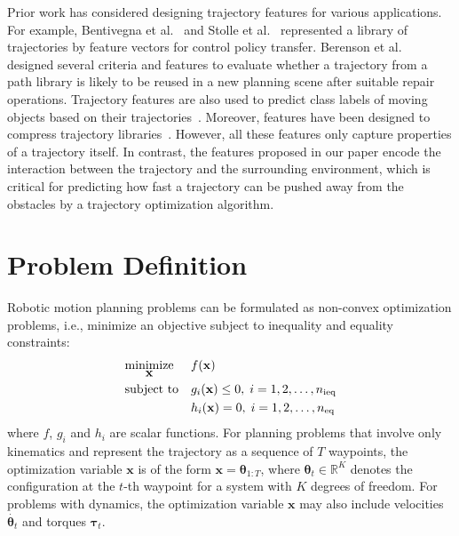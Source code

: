 \documentclass[letterpaper, 10 pt, conference]{ieeeconf}  %
\newcommand{\x}{\mbox{$\mathbf x$}}
\newcommand{\btheta}{\mbox{$\bm \theta$}}
\begin{document}
Prior work has considered designing trajectory features for various applications. For example, Bentivegna et al.~\cite{Bentivegna:2006:LST} and Stolle et al.~\cite{Stolle:2007:TPT} represented a library of trajectories by feature vectors for control policy transfer. 
Berenson et al.~\cite{Berenson:2012:RPP} designed several criteria and features to evaluate whether a trajectory from a path library is likely to be reused in a new planning scene after suitable repair operations. Trajectory features are also used to predict class labels of moving objects based on their trajectories~\cite{Lee:2008:TTC}. Moreover, features have been designed to compress trajectory libraries~\cite{Arikan:2006:CMC}. However, all these features only capture properties of a trajectory itself. In contrast, the features proposed in our paper encode the interaction between the trajectory and the surrounding environment, which is critical for predicting how fast a trajectory can be pushed away from the obstacles by a trajectory optimization algorithm.


\section{Problem Definition}
\label{sec:probstatement}

Robotic motion planning problems can be formulated as non-convex optimization problems, i.e., minimize an objective subject to inequality and equality constraints:
\begin{align}
\label{eq:opt}
& \underset{\x}{\text{minimize}}
& & f(\x) \\
& \text{subject to}
& & g_i(\x) \leq 0, \; i = 1, 2, \dots, n_{\text{ieq}} \notag \\
&&& h_i(\x) = 0, \; i = 1, 2, \dots, n_{\text{eq}} \notag
\end{align}
where $f$, $g_i$ and $h_i$ are scalar functions. For planning problems that involve only kinematics and represent the trajectory as a sequence of $T$ waypoints, the optimization variable $\x$ is of the form $\x = \btheta_{1:T}$, where $\btheta_t \in \mathbb{R}^K$ denotes the configuration at the $t$-th waypoint for a system with $K$ degrees of freedom. For problems with dynamics, the optimization variable $\x$ may also include velocities $\dot{\btheta_t}$ and torques ${\bm \tau}_t$.
\end{document}
